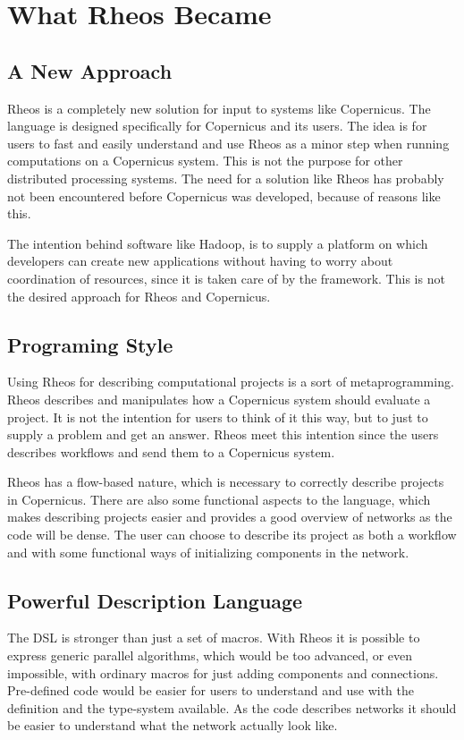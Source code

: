 \section{What Rheos Became}

\subsection{A New Approach}
Rheos is a completely new solution for input to systems like
Copernicus. The language is designed specifically for Copernicus and
its users. The idea is for users to fast and easily understand and use
Rheos as a minor step when running computations on a Copernicus
system. This is not the purpose for other distributed processing
systems. The need for a solution like Rheos has probably not been
encountered before Copernicus was developed, because of reasons like
this.

The intention behind software like Hadoop, is to supply a platform on
which developers can create new applications without having to worry
about coordination of resources, since it is taken care of by the
framework. This is not the desired approach for Rheos and Copernicus.

\subsection{Programing Style}
Using Rheos for describing computational projects is a sort of
metaprogramming. Rheos describes and manipulates how a Copernicus
system should evaluate a project. It is not the intention for users
to think of it this way, but to just to supply a problem and get an
answer. Rheos meet this intention since the users describes workflows
and send them to a Copernicus system.

Rheos has a flow-based nature, which is necessary to correctly
describe projects in Copernicus. There are also some functional
aspects to the language, which makes describing projects easier and
provides a good overview of networks as the code will be dense. The
user can choose to describe its project as both a workflow and with
some functional ways of initializing components in the network.


\subsection{Powerful Description Language}
The DSL is stronger than just a set of macros. With Rheos it is
possible to express generic parallel algorithms, which would be too
advanced, or even impossible, with ordinary macros for just adding
components and connections. Pre-defined code would be easier for users
to understand and use with the definition and the type-system
available. As the code describes networks it should be easier to
understand what the network actually look like.

